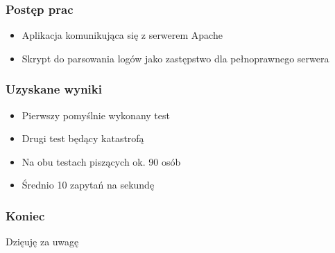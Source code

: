 \documentclass{beamer}
\begin{document}
  \begin{frame}
    \frametitle{Postęp prac}
    \begin{itemize}
    \item Aplikacja komunikująca się z serwerem Apache
    \item Skrypt do parsowania logów jako zastępstwo dla pełnoprawnego serwera
    \end{itemize}
  \end{frame}
  \begin{frame}
    \frametitle{Uzyskane wyniki}
    \begin{itemize}
    \item Pierwszy pomyślnie wykonany test
    \item Drugi test będący katastrofą
    \item Na obu testach piszących ok. 90 osób
    \item Średnio 10 zapytań na sekundę
    \end{itemize}
  \end{frame}
  \begin{frame}
  	\frametitle{Koniec}
    \begin{center}
    \Huge Dzięuję za uwagę
    \end{center}
  \end{frame}
\end{document}
